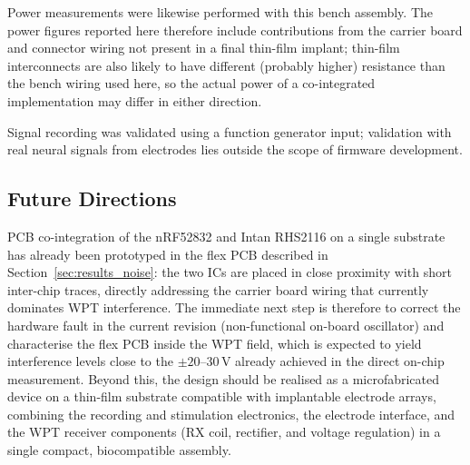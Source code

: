 Power measurements were likewise performed with this bench assembly. The power
figures reported here therefore include contributions from the carrier board and
connector wiring not present in a final thin-film implant; thin-film interconnects
are also likely to have different (probably higher) resistance than the bench
wiring used here, so the actual power of a co-integrated implementation may differ
in either direction.

Signal recording was validated using a function generator input; validation with
real neural signals from electrodes lies outside the scope of firmware development.

\subsection{Future Directions}

PCB co-integration of the nRF52832 and Intan RHS2116 on a single substrate has
already been prototyped in the flex PCB described in Section~\ref{sec:results_noise}:
the two ICs are placed in close proximity with short inter-chip traces, directly
addressing the carrier board wiring that currently dominates WPT interference.
The immediate next step is therefore to correct the hardware fault in the current
revision (non-functional on-board oscillator) and characterise the flex PCB inside
the WPT field, which is expected to yield interference levels close to the
$\pm20$--$30$\,\textmu{}V already achieved in the direct on-chip measurement.
Beyond this, the design should be realised as a microfabricated device on a
thin-film substrate compatible with implantable electrode arrays, combining the
recording and stimulation electronics, the electrode interface, and the WPT
receiver components (RX coil, rectifier, and voltage regulation) in a single
compact, biocompatible assembly.

